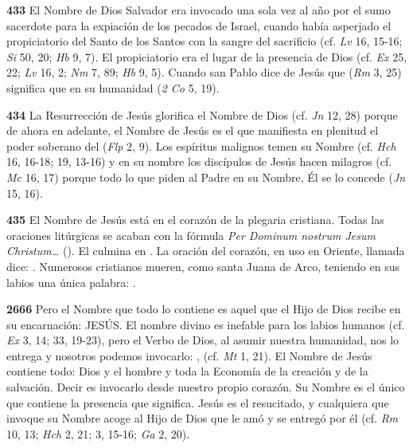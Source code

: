 \textbf{433} El Nombre de Dios Salvador era invocado una sola vez al año por el sumo sacerdote para la expiación de los pecados de Israel, cuando había asperjado el propiciatorio del Santo de los Santos con la sangre del sacrificio (cf. \emph{Lv} 16, 15-16; \emph{Si} 50, 20; \emph{Hb} 9, 7). El propiciatorio era el lugar de la presencia de Dios (cf. \emph{Ex} 25, 22; \emph{Lv} 16, 2; \emph{Nm} 7, 89; \emph{Hb} 9, 5). Cuando san Pablo dice de Jesús que  (\emph{Rm} 3, 25) significa que en su humanidad  (\emph{2 Co} 5, 19).

\textbf{434} La Resurrección de Jesús glorifica el Nombre de Dios  (cf. \emph{Jn} 12, 28) porque de ahora en adelante, el Nombre de Jesús es el que manifiesta en plenitud el poder soberano del  (\emph{Flp} 2, 9). Los espíritus malignos temen su Nombre (cf. \emph{Hch} 16, 16-18; 19, 13-16) y en su nombre los discípulos de Jesús hacen milagros (cf. \emph{Mc} 16, 17) porque todo lo que piden al Padre en su Nombre, Él se lo concede (\emph{Jn} 15, 16).

\textbf{435} El Nombre de Jesús está en el corazón de la plegaria cristiana. Todas las oraciones litúrgicas se acaban con la fórmula \emph{Per Dominum nostrum Jesum Christum\ldots{}} (). El  culmina en . La oración del corazón, en uso en Oriente, llamada  dice: . Numerosos cristianos mueren, como santa Juana de Arco, teniendo en sus labios una única palabra: .

\textbf{2666} Pero el Nombre que todo lo contiene es aquel que el Hijo de Dios recibe en su encarnación: JESÚS. El nombre divino es inefable para los labios humanos (cf. \emph{Ex} 3, 14; 33, 19-23), pero el Verbo de Dios, al asumir nuestra humanidad, nos lo entrega y nosotros podemos invocarlo: ,  (cf. \emph{Mt} 1, 21). El Nombre de Jesús contiene todo: Dios y el hombre y toda la Economía de la creación y de la salvación. Decir  es invocarlo desde nuestro propio corazón. Su Nombre es el único que contiene la presencia que significa. Jesús es el resucitado, y cualquiera que invoque su Nombre acoge al Hijo de Dios que le amó y se entregó por él (cf. \emph{Rm} 10, 13; \emph{Hch} 2, 21; 3, 15-16; \emph{Ga} 2, 20).

